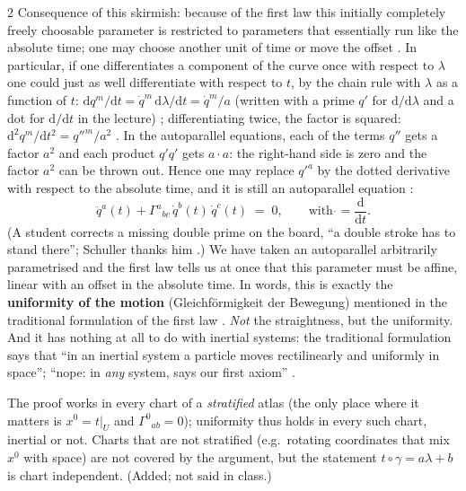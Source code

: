 \begin{paracol}{2}
Consequence of this skirmish: because of the first law this initially completely freely choosable parameter is restricted to parameters that essentially run like the absolute time; one may choose another unit of time or move the offset
. In particular, if one differentiates a component of the curve once with respect to $\lambda$ one could just as well differentiate with respect to $t$, by the chain rule with $\lambda$ as a function of $t$:
$\mathrm dq^m/\mathrm dt=\dot q^m\,\mathrm d\lambda/\mathrm dt=\dot q^m/a$ (written with a prime $q'$ for $\mathrm d/\mathrm d\lambda$ and a dot for $\mathrm d/\mathrm dt$ in the lecture)
; differentiating twice, the factor is squared: $\mathrm d^2q^m/\mathrm dt^2=q''^m/a^2$ . In the autoparallel equations, each of the terms $q''$ gets a factor $a^{2}$ and each product $q'q'$ gets $a\cdot a$: the right-hand side is zero and the
factor $a^2$ can be thrown out. Hence one may replace $q'^a$ by the dotted derivative with respect to the absolute time, and it is still an autoparallel equation :
\begin{equation}\label{eq:nk-autopar-t}
  \ddot q^a(t)+\Gamma^a{}_{bc}\,\dot q^b(t)\,\dot q^c(t)\;=\;0 ,\qquad\text{with }\dot{}=\frac{\mathrm d}{\mathrm dt}.
\end{equation}
(A student corrects a missing double prime on the board, ``a double stroke has to stand there''; Schuller thanks him .) We have taken an autoparallel arbitrarily parametrised and the first law tells us
at once that this parameter must be affine, linear with an offset in the absolute time. In words, this is exactly the \textbf{uniformity of the motion} (Gleichf\"ormigkeit der Bewegung) mentioned in the traditional formulation of the first law
. \emph{Not} the straightness, but the uniformity. And it has nothing at all to do with inertial systems: the traditional formulation says that ``in an inertial system a particle moves
rectilinearly and uniformly in space''; ``nope: in \emph{any} system, says our first axiom'' .

\begin{coursenote}
The proof works in every chart of a \emph{stratified} atlas (the only place where it matters is $x^0=t|_U$ and $\Gamma^0{}_{ab}=0$); uniformity thus holds in every such chart, inertial or not. Charts that are not stratified
(e.g.\ rotating coordinates that mix $x^0$ with space) are not covered by the argument, but the statement $t\circ\gamma=a\lambda+b$ is chart independent. (Added; not said in class.)
\end{coursenote}


\end{paracol}
